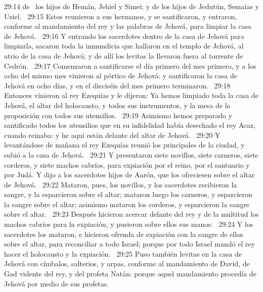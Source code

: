 																													29:14 de  los hijos de Hemán, Jehiel y Simei; y de los hijos de Jedutún, Semaías y Uziel.  
																													29:15 Estos reunieron a sus hermanos, y se santificaron, y entraron, conforme al mandamiento del rey y las palabras de Jehová, para limpiar la casa de Jehová.  
																													29:16 Y entrando los sacerdotes dentro de la casa de Jehová para limpiarla, sacaron toda la inmundicia que hallaron en el templo de Jehová, al atrio de la casa de Jehová; y de allí los levitas la llevaron fuera al torrente de Cedrón.  
																													29:17 Comenzaron a santificarse el día primero del mes primero, y a los ocho del mismo mes vinieron al pórtico de Jehová: y santificaron la casa de Jehová en ocho días, y en el dieciséis del mes primero terminaron.  
																													29:18 Entonces vinieron al rey Ezequías y le dijeron: Ya hemos limpiado toda la casa de Jehová, el altar del holocausto, y todos sus instrumentos, y la mesa de la proposición con todos sus utensilios.  
																													29:19 Asimismo hemos preparado y santificado todos los utensilios que en su infidelidad había desechado el rey Acaz, cuando reinaba: y he aquí están delante del altar de Jehová.  
																													29:20 Y levantándose de mañana el rey Ezequías reunió los principales de la ciudad, y subió a la casa de Jehová.  
																													29:21 Y presentaron siete novillos, siete carneros, siete corderos, y siete machos cabríos, para expiación por el reino, por el santuario y por Judá. Y dijo a los sacerdotes hijos de Aarón, que los ofreciesen sobre el altar de Jehová.  
																													29:22 Mataron, pues, los novillos, y los sacerdotes recibieron la sangre, y la esparcieron sobre el altar; mataron luego los carneros, y esparcieron la sangre sobre el altar; asimismo mataron los corderos, y esparcieron la sangre sobre el altar.  
																													29:23 Después hicieron acercar delante del rey y de la multitud los machos cabríos para la expiación, y pusieron sobre ellos sus manos:  
																													29:24 Y los sacerdotes los mataron, e hicieron ofrenda de expiación con la sangre de ellos sobre el altar, para reconciliar a todo Israel; porque por todo Israel mandó el rey hacer el holocausto y la expiación.  
																													29:25 Puso también levitas en la casa de Jehová con címbalos, salterios, y arpas, conforme al mandamiento de David, de Gad vidente del rey, y del profeta Natán: porque aquel mandamiento procedía de Jehová por medio de sus profetas.  
